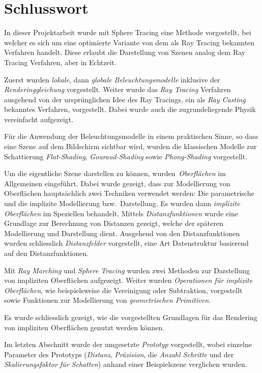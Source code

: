 
\chapter{Schlusswort}
\label{chap:discussion_and_conclusion}

In dieser Projektarbeit wurde mit Sphere Tracing eine Methode
vorgestellt, bei welcher es sich um eine optimierte Variante von dem als
Ray Tracing bekannten Verfahren handelt. Diese erlaubt die Darstellung
von Szenen analog dem Ray Tracing Verfahren, aber in Echtzeit.

Zuerst wurden \textit{lokale}, dann \textit{globale Beleuchtungsmodelle} inklusive der
\textit{Renderinggleichung} vorgestellt. Weiter wurde das \textit{Ray Tracing}
Verfahren ausgehend von der ursprünglichen Idee des Ray Tracings, ein
als \textit{Ray Casting} bekanntes Verfahren, vorgestellt. Dabei wurde auch die
zugrundeliegende Physik vereinfacht aufgezeigt.

Für die Anwendung der Beleuchtungsmodelle in einem praktischen Sinne, so
dass eine Szene auf dem Bildschirm sichtbar wird, wurden die klassischen
Modelle zur Schattierung \textit{Flat-Shading}, \textit{Gouraud-Shading}
sowie \textit{Phong-Shading} vorgestellt.

Um die eigentliche Szene darstellen zu können,
wurden~\textit{Oberflächen} im Allgemeinen eingeführt. Dabei wurde
gezeigt, dass zur Modellierung von Oberflächen hauptsächlich zwei
Techniken verwendet werden: Die parametrische und die implizite
Modellierung bzw.\ Darstellung. Es wurden dann \textit{implizite
    Oberflächen} im Speziellen behandelt. Mittels
\textit{Distanzfunktionen} wurde eine Grundlage zur Berechnung von
Distanzen gezeigt, welche der späteren Modellierung und Darstellung
dient. Ausgehend von den Distanzfunktionen wurden schliesslich
\textit{Distanzfelder} vorgestellt, eine Art Datenstruktur basierend auf
den Distanzfunktionen.

Mit \textit{Ray Marching} und \textit{Sphere Tracing} wurden zwei
Methoden zur Darstellung von impliziten Oberflächen aufgezeigt. Weiter
wurden \textit{Operationen für implizite Oberflächen}, wie
beispielsweise die Vereinigung oder Subtraktion, vorgestellt sowie
Funktionen zur Modellierung von \textit{geometrischen Primitiven}.

Es wurde schliesslich gezeigt, wie die vorgestellten Grundlagen für das
Rendering von impliziten Oberflächen genutzt werden können.

Im letzten Abschnitt wurde der umgesetzte \textit{Prototyp} vorgestellt,
wobei einzelne Parameter des Prototyps (\textit{Distanz},
\textit{Präzision}, die \textit{Anzahl Schritte} und der
\textit{Skalierungsfaktor für Schatten}) anhand einer Beispielszene
verglichen wurden.


